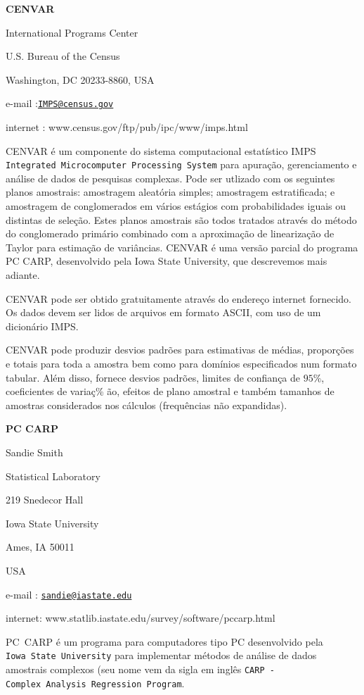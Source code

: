\documentclass[]{book}
\numberwithin{example}{chapter}
\numberwithin{remark}{chapter}
\numberwithin{definition}{chapter}
\begin{document}
\textbf{CENVAR}

International Programs Center

U.S. Bureau of the Census

Washington, DC 20233-8860, USA

e-mail :\href{mailto:IMPS@census.gov}{\nolinkurl{IMPS@census.gov}}

internet : www.census.gov/ftp/pub/ipc/www/imps.html

CENVAR é um componente do sistema computacional estatístico IMPS
\texttt{Integrated\ Microcomputer\ Processing\ System} para apuração,
gerenciamento e análise de dados de pesquisas complexas. Pode ser
utlizado com os seguintes planos amostrais: amostragem aleatória
simples; amostragem estratificada; e amostragem de conglomerados em
vários estágios com probabilidades iguais ou distintas de seleção. Estes
planos amostrais são todos tratados através do método do conglomerado
primário combinado com a aproximação de linearização de Taylor para
estimação de variâncias. CENVAR é uma versão parcial do programa PC
CARP, desenvolvido pela Iowa State University, que descrevemos mais
adiante.

CENVAR pode ser obtido gratuitamente através do endereço internet
fornecido. Os dados devem ser lidos de arquivos em formato ASCII, com
uso de um dicionário IMPS.

CENVAR pode produzir desvios padrões para estimativas de médias,
proporções e totais para toda a amostra bem como para domínios
especificados num formato tabular. Além disso, fornece desvios padrões,
limites de confiança de \(95\%\), coeficientes de variaç\% ão, efeitos
de plano amostral e também tamanhos de amostras considerados nos
cálculos (frequências não expandidas).

\textbf{PC CARP}

Sandie Smith

Statistical Laboratory

219 Snedecor Hall

Iowa State University

Ames, IA 50011

USA

e-mail :
\href{mailto:sandie@iastate.edu}{\nolinkurl{sandie@iastate.edu}}

internet: www.statlib.iastate.edu/survey/software/pccarp.html

PC~CARP é um programa para computadores tipo PC desenvolvido pela
\texttt{Iowa\ State\ University} para implementar métodos de análise de
dados amostrais complexos (seu nome vem da sigla em inglês
\texttt{CARP\ -Complex\ Analysis\ Regression\ Program}.
\end{document}
